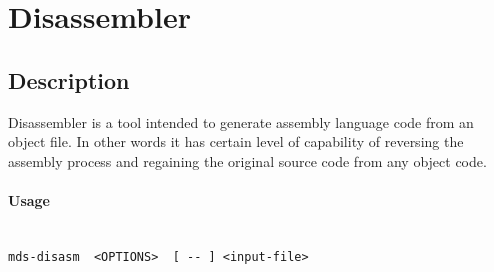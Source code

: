 \section{Disassembler}
    \subsection{Description}
        Disassembler is a tool intended to generate assembly language code from an object file. In other words it has certain level of capability of reversing the assembly process and regaining the original source code from any object code.

    \paragraph{Usage}~\\
        \verb'mds-disasm  <OPTIONS>  [ -- ] <input-file>'

